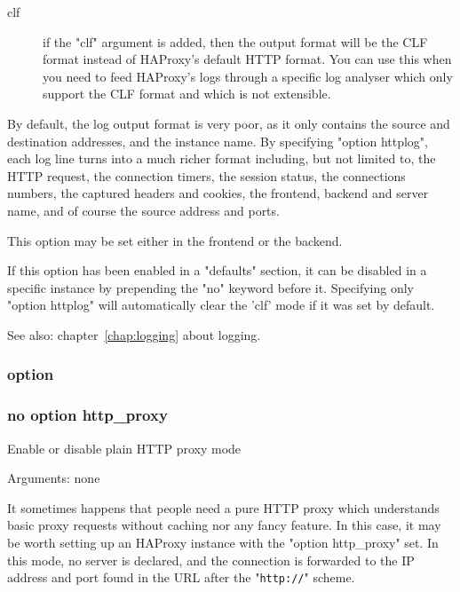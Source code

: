 {\begin{description}
\item[clf]       if the "clf" argument is added, then the output format will be
              the CLF format instead of HAProxy's default HTTP format. You can
              use this when you need to feed HAProxy's logs through a specific
              log analyser which only support the CLF format and which is not
              extensible.
\end{description}

  By default, the log output format is very poor, as it only contains the
  source and destination addresses, and the instance name. By specifying
  "option httplog", each log line turns into a much richer format including,
  but not limited to, the HTTP request, the connection timers, the session
  status, the connections numbers, the captured headers and cookies, the
  frontend, backend and server name, and of course the source address and
  ports.

  This option may be set either in the frontend or the backend.

  If this option has been enabled in a "defaults" section, it can be disabled
  in a specific instance by prepending the "no" keyword before it. Specifying
  only "option httplog" will automatically clear the 'clf' mode if it was set
  by default.

  See also:  chapter~\ref{chap:logging} about logging.

\subsubsection[http\_proxy]{option }
\subsubsection*{no option http\_proxy}

  Enable or disable plain HTTP proxy mode

                                 
  Arguments: none

  It sometimes happens that people need a pure HTTP proxy which understands
  basic proxy requests without caching nor any fancy feature. In this case,
  it may be worth setting up an HAProxy instance with the "option http\_proxy"
  set. In this mode, no server is declared, and the connection is forwarded to
  the IP address and port found in the URL after the "\verb|http://|" scheme.

}
